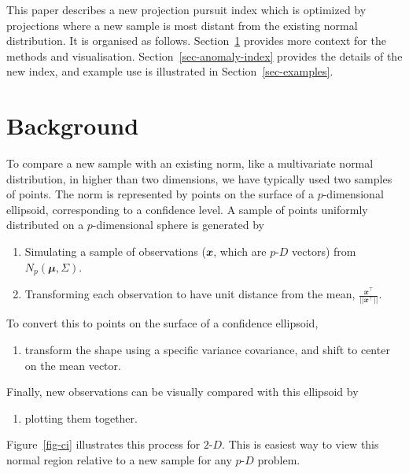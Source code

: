 \documentclass[
  12pt]{article}
\providecommand{\tightlist}{%
  \setlength{\itemsep}{0pt}\setlength{\parskip}{0pt}}\usepackage{longtable,booktabs,array}
\def\tightlist{}
\newcommand\pD{$p\text{-}D$}
\newcommand\gD{$2\text{-}D$}
\begin{document}
This paper describes a new projection pursuit index which is optimized
by projections where a new sample is most distant from the existing
normal distribution. It is organised as follows.
Section~\ref{sec-background} provides more context for the methods and
visualisation. Section~\ref{sec-anomaly-index} provides the details of
the new index, and example use is illustrated in
Section~\ref{sec-examples}.

\section{Background}\label{sec-background}

To compare a new sample with an existing norm, like a multivariate
normal distribution, in higher than two dimensions, we have typically
used two samples of points. The norm is represented by points on the
surface of a \(p\)-dimensional ellipsoid, corresponding to a confidence
level. A sample of points uniformly distributed on a \(p\)-dimensional
sphere is generated by

\begin{enumerate}
\def\labelenumi{\arabic{enumi}.}
\tightlist
\item
  Simulating a sample of observations (\(\mathbfit{x}\), which are \pD{}
  vectors) from \(N_p(\mathbfit{\mu}, \Sigma)\).
\item
  Transforming each observation to have unit distance from the mean,
  \(\frac{\mathbfit{x}^\top}{||\mathbfit{x}^\top||}\).
\end{enumerate}

To convert this to points on the surface of a confidence ellipsoid,

\begin{enumerate}
\def\labelenumi{\arabic{enumi}.}
\setcounter{enumi}{2}
\tightlist
\item
  transform the shape using a specific variance covariance, and shift to
  center on the mean vector.
\end{enumerate}

Finally, new observations can be visually compared with this ellipsoid
by

\begin{enumerate}
\def\labelenumi{\arabic{enumi}.}
\setcounter{enumi}{3}
\tightlist
\item
  plotting them together.
\end{enumerate}

Figure~\ref{fig-ci} illustrates this process for \gD. This is easiest
way to view this normal region relative to a new sample for any \pD{}
problem.
\end{document}
